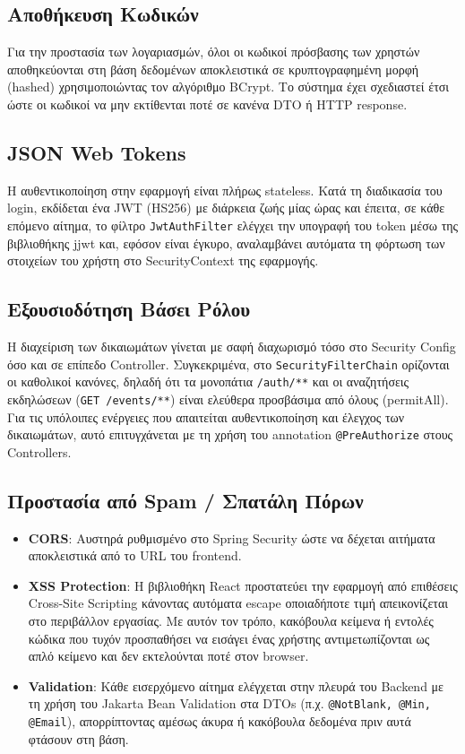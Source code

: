 \documentclass[12pt]{fphw}
\newcommand{\en}[1]{\foreignlanguage{english}{#1}}
\begin{document}
\subsection{Αποθήκευση Κωδικών}
Για την προστασία των λογαριασμών, όλοι οι κωδικοί πρόσβασης των χρηστών αποθηκεύονται στη βάση δεδομένων αποκλειστικά σε κρυπτογραφημένη μορφή (\en{hashed}) χρησιμοποιώντας τον αλγόριθμο \en{BCrypt}. Το σύστημα έχει σχεδιαστεί έτσι ώστε οι κωδικοί να μην εκτίθενται ποτέ σε κανένα \en{DTO} ή \en{HTTP response}.

\subsection{JSON Web Tokens}
Η αυθεντικοποίηση στην εφαρμογή είναι πλήρως \en{stateless}. Κατά τη διαδικασία του \en{login}, εκδίδεται ένα \en{JWT (HS256)} με διάρκεια ζωής μίας ώρας και έπειτα, σε κάθε επόμενο αίτημα, το φίλτρο \en{\texttt{JwtAuthFilter}} ελέγχει την υπογραφή του \en{token} μέσω της βιβλιοθήκης \en{jjwt} και, εφόσον είναι έγκυρο, αναλαμβάνει αυτόματα τη φόρτωση των στοιχείων του χρήστη στο \en{SecurityContext} της εφαρμογής.

\subsection{Εξουσιοδότηση Βάσει Ρόλου}
Η διαχείριση των δικαιωμάτων γίνεται με σαφή διαχωρισμό τόσο στο \en{Security Config} όσο και σε επίπεδο \en{Controller}. Συγκεκριμένα, στο \en{\texttt{SecurityFilterChain}} ορίζονται οι καθολικοί κανόνες, δηλαδή ότι τα μονοπάτια \en{\texttt{/auth/**}} και οι αναζητήσεις εκδηλώσεων (\en{\texttt{GET /events/**}}) είναι ελεύθερα προσβάσιμα από όλους (\en{permitAll}). Για τις υπόλοιπες ενέργειες που απαιτείται αυθεντικοποίηση και έλεγχος των δικαιωμάτων, αυτό επιτυγχάνεται με τη χρήση του annotation \en{\texttt{@PreAuthorize}} στους \en{Controllers}.

\subsection{Προστασία από Spam / Σπατάλη Πόρων}
\begin{itemize}[leftmargin=*]
    \item \en{\textbf{CORS}:} Αυστηρά ρυθμισμένο στο \en{Spring Security} ώστε να δέχεται αιτήματα αποκλειστικά από το \en{URL} του \en{frontend}.
    \item \en{\textbf{XSS Protection}:} Η βιβλιοθήκη \en{React} προστατεύει την εφαρμογή από επιθέσεις \en{Cross-Site Scripting} κάνοντας αυτόματα \en{escape} οποιαδήποτε τιμή απεικονίζεται στο περιβάλλον εργασίας. Με αυτόν τον τρόπο, κακόβουλα κείμενα ή εντολές κώδικα που τυχόν προσπαθήσει να εισάγει ένας χρήστης αντιμετωπίζονται ως απλό κείμενο και δεν εκτελούνται ποτέ στον browser.
    \item \en{\textbf{Validation}:} Κάθε εισερχόμενο αίτημα ελέγχεται στην πλευρά του \en{Backend} με τη χρήση του \en{Jakarta Bean Validation} στα DTOs (π.χ. \en{\texttt{@NotBlank, @Min, @Email}}), απορρίπτοντας αμέσως άκυρα ή κακόβουλα δεδομένα πριν αυτά φτάσουν στη βάση.
\end{itemize}
\end{document}
